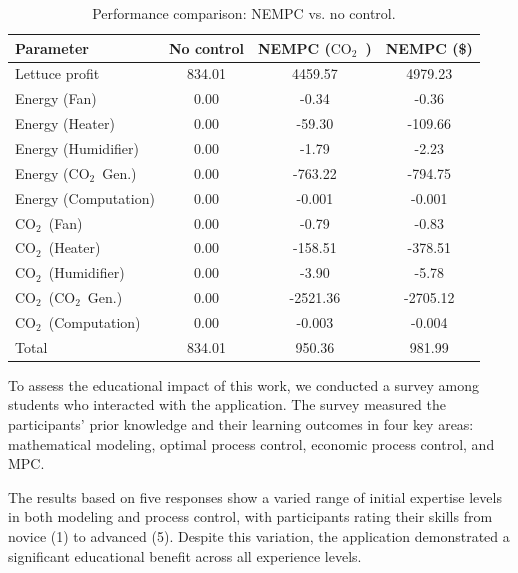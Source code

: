 \documentclass[conference]{IEEEtran}
\newcommand{\coo}{\ensuremath{\mathrm{CO_2}}}
\begin{document}
\begin{table}
    \centering
    \caption{Performance comparison: NEMPC {vs. } no control.}\label{tab:comparison}
    \begin{tabular}{lS[table-format=4.2]S[table-format=4.2]S[table-format=4.2]}
        \toprule
        Parameter            & {No control} & {NEMPC (\coo\ )} & {NEMPC (\$)} \\
        \midrule
        Lettuce profit       & 834.01       & 4459.57          & 4979.23      \\
        Energy (Fan)         & 0.00         & -0.34            & -0.36        \\
        Energy (Heater)      & 0.00         & -59.30           & -109.66      \\
        Energy (Humidifier)  & 0.00         & -1.79            & -2.23        \\
        Energy (\coo\ Gen.)  & 0.00         & -763.22          & -794.75      \\
        Energy (Computation) & 0.00         & -0.001           & -0.001       \\
        \coo\ (Fan)          & 0.00         & -0.79            & -0.83        \\
        \coo\ (Heater)       & 0.00         & -158.51          & -378.51      \\
        \coo\ (Humidifier)   & 0.00         & -3.90            & -5.78        \\
        \coo\ (\coo\ Gen.)   & 0.00         & -2521.36         & -2705.12     \\
        \coo\ (Computation)  & 0.00         & -0.003           & -0.004       \\
        \midrule
        Total                & 834.01       & 950.36           & 981.99       \\
        \bottomrule
    \end{tabular}
\end{table}

To assess the educational impact of this work, we conducted a survey among students who interacted with the application. The survey measured the participants' prior knowledge and their learning outcomes in four key areas: mathematical modeling, optimal process control, economic process control, and MPC.\@

The results based on five responses show a varied range of initial expertise levels in both modeling and process control, with participants rating their skills from novice (1) to advanced (5). Despite this variation, the application demonstrated a significant educational benefit across all experience levels.
\end{document}
